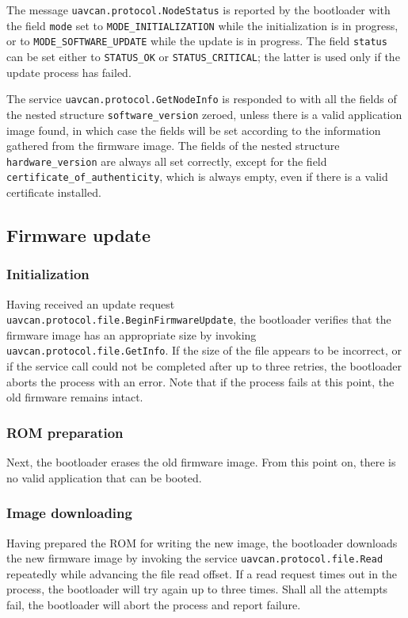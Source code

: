 \documentclass{zubaxdoc}
\begin{document}
The message \verb|uavcan.protocol.NodeStatus| is reported by the bootloader with the field
\verb|mode| set to \verb|MODE_INITIALIZATION| while the initialization is in progress,
or to \verb|MODE_SOFTWARE_UPDATE| while the update is in progress.
The field \verb|status| can be set either to \verb|STATUS_OK| or \verb|STATUS_CRITICAL|;
the latter is used only if the update process has failed.

The service \verb|uavcan.protocol.GetNodeInfo| is responded to with all the fields of the nested structure
\verb|software_version| zeroed, unless there is a valid application image found,
in which case the fields will be set according to the information gathered from the firmware image.
The fields of the nested structure \verb|hardware_version| are always all set correctly,
except for the field \verb|certificate_of_authenticity|, which is always empty, even if there is
a valid certificate installed.

\subsection{Firmware update}

\subsubsection{Initialization}

Having received an update request \verb|uavcan.protocol.file.BeginFirmwareUpdate|,
the bootloader verifies that the firmware image has an appropriate size by invoking
\verb|uavcan.protocol.file.GetInfo|.
If the size of the file appears to be incorrect,
or if the service call could not be completed after up to three retries,
the bootloader aborts the process with an error.
Note that if the process fails at this point, the old firmware remains intact.

\subsubsection{ROM preparation}

Next, the bootloader erases the old firmware image.
From this point on, there is no valid application that can be booted.

\subsubsection{Image downloading}

Having prepared the ROM for writing the new image, the bootloader downloads the new
firmware image by invoking the service \verb|uavcan.protocol.file.Read|
repeatedly while advancing the file read offset.
If a read request times out in the process, the bootloader will try again up to three times.
Shall all the attempts fail, the bootloader will abort the process and report failure.
\end{document}
